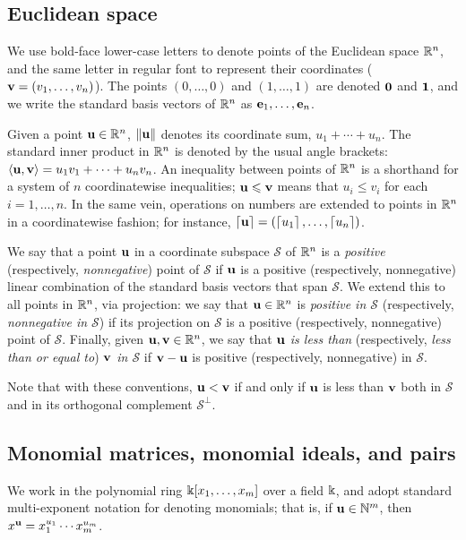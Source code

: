 \documentclass{article}
\begin{document}
\subsection{Euclidean space}
\label{ss: euclidean spaces and convexity}
We use bold-face lower-case letters to denote points of the Euclidean space $\mathbb{R}^n$, and the same letter in regular font to represent their coordinates (\eg $\mathbf{v}=(v_1,\ldots,v_n)$).
The points $(0,\ldots,0)$ and $(1,\ldots,1)$ are denoted $\mathbf{0}$ and $\mathbf{1}$, and we write the standard basis vectors of $\mathbb{R}^n$ as $\mathbf{e}_1,\ldots,\mathbf{e}_n$.

Given a point $\mathbf{u}\in \mathbb{R}^n$, $\| \mathbf{u} \|$ denotes its coordinate sum, $u_1+\cdots+u_n$.
The standard inner product in $\mathbb{R}^n$ is denoted by the usual angle brackets: $\langle \mathbf{u}, \mathbf{v} \rangle = u_1v_1 + \cdots + u_nv_n$.
An inequality between points of $\mathbb{R}^n$ is a shorthand for a system of $n$ coordinatewise inequalities; \eg $\mathbf{u}\leqslant \mathbf{v}$ means that $u_i \le v_i$ for each $i=1,\ldots,n$.
In the same vein, operations on numbers are extended to points in $\mathbb{R}^n$ in a coordinatewise fashion; for instance, $\left\lceil \mathbf{u} \right\rceil=(\left\lceil u_1 \right\rceil,\ldots,\left\lceil u_n \right\rceil)$.

We say that a point $\mathbf{u}$ in a coordinate subspace $\mathcal{S}$ of $\mathbb{R}^n$ is a \emph{positive} (respectively, \emph{nonnegative}) point of $\mathcal{S}$ if $\mathbf{u}$ is a positive (respectively, nonnegative) linear combination of the standard basis vectors that span $\mathcal{S}$.
We extend this to all points in $\mathbb{R}^n$, via projection: we say that $\mathbf{u} \in \mathbb{R}^n$ is \emph{positive in $\mathcal{S}$} (respectively, \emph{nonnegative in $\mathcal{S}$}) if its projection on $\mathcal{S}$ is a positive (respectively, nonnegative) point of $\mathcal{S}$.
Finally, given $\mathbf{u},\mathbf{v}\in \mathbb{R}^n$, we say that \emph{$\mathbf{u}$ is less than} (respectively, \emph{less than or equal to}) \emph{$\mathbf{v}$ in $\mathcal{S}$} if $\mathbf{v}-\mathbf{u}$ is positive (respectively, nonnegative) in $\mathcal{S}$.

Note that with these conventions, $\mathbf{u} < \mathbf{v}$ if and only if $\mathbf{u}$ is less than $\mathbf{v}$ both in $\mathcal{S}$ and in its orthogonal complement $\mathcal{S}^\perp$.

\subsection{Monomial matrices, monomial ideals, and pairs}
\label{monomial newton preliminaries: ss}

We work in the polynomial ring $\Bbbk[x_1, \ldots, x_m]$ over a field $\Bbbk$, and adopt standard multi-exponent notation for denoting monomials; that is, if $\mathbf{u} \in \mathbb{N}^m$, then $x^{\mathbf{u}} = x_1^{u_1} \cdots x_m^{u_m}$.
\end{document}
